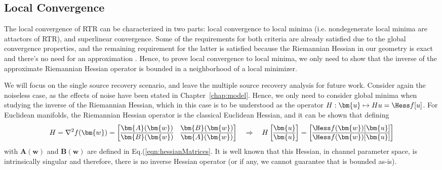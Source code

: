 \subsection{Local Convergence}

The local convergence of RTR can be characterized in two parts: local convergence to local minima (i.e. nondegenerate local minima are attactors of RTR), and superlinear convergence. Some of the requirements for both criteria are already satisfied due to the global convergence properties, and the remaining requirement for the latter is satisfied because the Riemannian Hessian in our geometry is exact and there's no need for an approximation \cite[Theorem 4.11]{Absil2007trustregions}. Hence, to prove local convergence to local minima, we only need to show that the inverse of the approximate Riemannian Hessian operator is bounded in a neighborhood of a local minimizer.

We will focus on the single source recovery scenario, and leave the multiple source recovery analysis for future work. Consider again the noiseless case, as the effects of noise have been stated in Chapter~\ref{chap:model}. Hence, we only need to consider global minima when studying the inverse of the Riemannian Hessian, which in this case is to be understood as the operator  $H:\bm{u}\mapsto Hu=\Hess f[u]$. For Euclidean manifolds, the Riemannian Hessian operator is the classical Euclidean Hessian, and it can be shown that defining
\begin{align}
H=\nabla^2f(\bm{w})=\begin{bmatrix}
\bm{A}(\bm{w}) & \bm{B}(\bm{w})\\ \overline{\bm{B}(\bm{w})} & \overline{\bm{A}(\bm{w})}\end{bmatrix}\quad\Rightarrow\quad H\begin{bmatrix}\bm{u}\\\overline{\bm{u}}\end{bmatrix}=\begin{bmatrix}\Hess f(\bm{w})[\bm{u}]\\ \overline{\Hess f(\bm{w})[\bm{u}]}\end{bmatrix}
\end{align}
with $\bm{A}(\bm{w})$ and $\bm{B}(\bm{w})$ are defined in Eq.(\ref{eqn:hessianMatrices}. It is well known that this Hessian, in channel parameter space, is intrinsically singular \cite{Kreutz2008trustregionscma} and therefore, there is no inverse Hessian operator (or if any, we cannot guarantee that is bounded as-is). 

